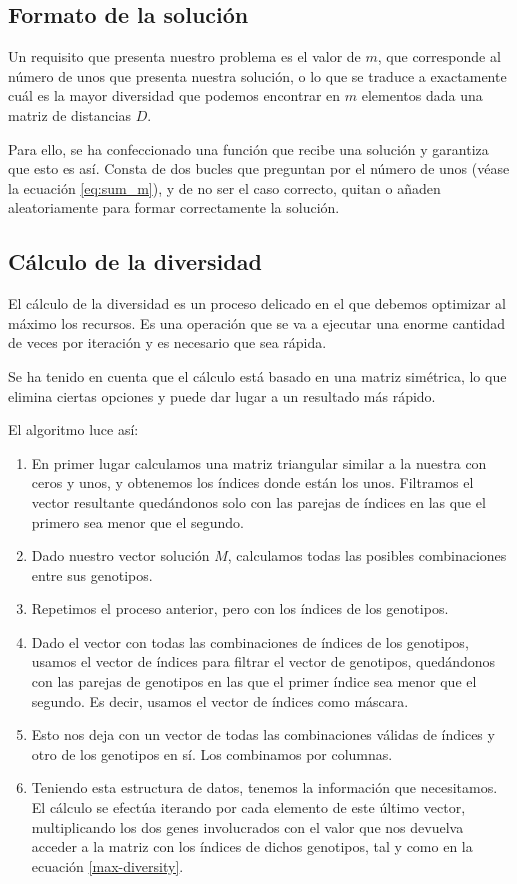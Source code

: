 \subsection{Formato de la solución}
Un requisito que presenta nuestro problema es el valor de $m$, que corresponde al número de unos que presenta nuestra solución, o lo que se traduce a exactamente cuál es la mayor diversidad que podemos encontrar en $m$ elementos dada una matriz de distancias $D$.

Para ello, se ha confeccionado una función  que recibe una solución y garantiza que esto es así. Consta de dos bucles  que preguntan por el número de unos (véase la ecuación \ref{eq:sum_m}), y de no ser el caso correcto, quitan o añaden aleatoriamente para formar correctamente la solución.


\subsection{Cálculo de la diversidad}
El cálculo de la diversidad es un proceso delicado en el que debemos optimizar al máximo los recursos. Es una operación que se va a ejecutar una enorme cantidad de veces por iteración y es necesario que sea rápida.

Se ha tenido en cuenta que el cálculo está basado en una matriz simétrica, lo que elimina ciertas opciones y puede dar lugar a un resultado más rápido.

El algoritmo luce así:

\begin{enumerate}
    \item En primer lugar calculamos una matriz triangular similar a la nuestra con ceros y unos, y obtenemos los índices donde están los unos. Filtramos el vector resultante quedándonos solo con las parejas de índices en las que el primero sea menor que el segundo.
    \item Dado nuestro vector solución $M$, calculamos todas las posibles combinaciones entre sus genotipos.
    \item Repetimos el proceso anterior, pero con los índices de los genotipos.
    \item Dado el vector con todas las combinaciones de índices de los genotipos, usamos el vector de índices para filtrar el vector de genotipos, quedándonos con las parejas de genotipos en las que el primer índice sea menor que el segundo. Es decir, usamos el vector de índices como máscara.
    \item Esto nos deja con un vector de todas las combinaciones válidas de índices y otro de los genotipos en sí. Los combinamos por columnas.
    \item Teniendo esta estructura de datos, tenemos la información que necesitamos. El cálculo se efectúa iterando por cada elemento de este último vector, multiplicando los dos genes involucrados con el valor que nos devuelva acceder a la matriz con los índices de dichos genotipos, tal y como en la ecuación \ref{max-diversity}.
\end{enumerate}

